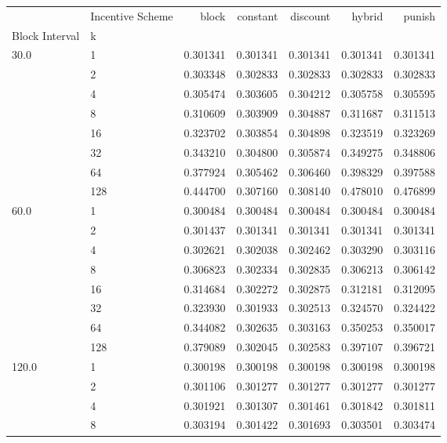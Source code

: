 \begin{tabular}{llrrrrr}
\toprule
      & Incentive Scheme &     block &  constant &  discount &    hybrid &    punish \\
Block Interval & k &           &           &           &           &           \\
\midrule
30.0  & 1   &  0.301341 &  0.301341 &  0.301341 &  0.301341 &  0.301341 \\
      & 2   &  0.303348 &  0.302833 &  0.302833 &  0.302833 &  0.302833 \\
      & 4   &  0.305474 &  0.303605 &  0.304212 &  0.305758 &  0.305595 \\
      & 8   &  0.310609 &  0.303909 &  0.304887 &  0.311687 &  0.311513 \\
      & 16  &  0.323702 &  0.303854 &  0.304898 &  0.323519 &  0.323269 \\
      & 32  &  0.343210 &  0.304800 &  0.305874 &  0.349275 &  0.348806 \\
      & 64  &  0.377924 &  0.305462 &  0.306460 &  0.398329 &  0.397588 \\
      & 128 &  0.444700 &  0.307160 &  0.308140 &  0.478010 &  0.476899 \\
60.0  & 1   &  0.300484 &  0.300484 &  0.300484 &  0.300484 &  0.300484 \\
      & 2   &  0.301437 &  0.301341 &  0.301341 &  0.301341 &  0.301341 \\
      & 4   &  0.302621 &  0.302038 &  0.302462 &  0.303290 &  0.303116 \\
      & 8   &  0.306823 &  0.302334 &  0.302835 &  0.306213 &  0.306142 \\
      & 16  &  0.314684 &  0.302272 &  0.302875 &  0.312181 &  0.312095 \\
      & 32  &  0.323930 &  0.301933 &  0.302513 &  0.324570 &  0.324422 \\
      & 64  &  0.344082 &  0.302635 &  0.303163 &  0.350253 &  0.350017 \\
      & 128 &  0.379089 &  0.302045 &  0.302583 &  0.397107 &  0.396721 \\
120.0 & 1   &  0.300198 &  0.300198 &  0.300198 &  0.300198 &  0.300198 \\
      & 2   &  0.301106 &  0.301277 &  0.301277 &  0.301277 &  0.301277 \\
      & 4   &  0.301921 &  0.301307 &  0.301461 &  0.301842 &  0.301811 \\
      & 8   &  0.303194 &  0.301422 &  0.301693 &  0.303501 &  0.303474 \\

\end{tabular}
